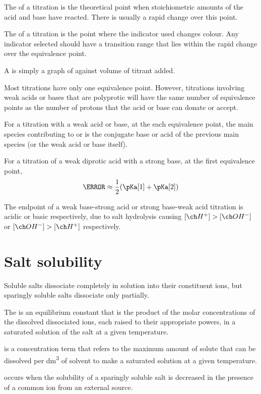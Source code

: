 \documentclass[Chemistry.tex]{subfiles}
\begin{document}
The  of a titration is the theoretical point when stoichiometric amounts of the acid and base have reacted. There is usually a rapid \pH{} change over this point.

The  of a titration is the point where the indicator used changes colour. Any indicator selected should have a \pH{} transition range that lies within the rapid change over the equivalence point.

A  is simply a graph of \pH{} against volume of titrant added.

Most titrations have only one equivalence point. However, titrations involving weak acids or bases that are polyprotic will have the same number of equivalence points as the number of protons that the acid or base can donate or accept.

For a titration with a weak acid or base, at the each equivalence point, the main species contributing to \pH{} or \pOH{} is the conjugate base or acid of the previous main species (or the weak acid or base itself).

For a titration of a weak diprotic acid with a strong base, at the first equivalence point, \begin{equation}\pH \approx \frac{1}{2}(\pKa[1] + \pKa[2])\end{equation}

The endpoint of a weak base-strong acid or strong base-weak acid titration is acidic or basic respectively, due to salt hydrolysis causing \(\conc{H^+} > \conc{OH^-}\) or \(\conc{OH^-} > \conc{H^+}\) respectively.
\section{Salt solubility}
Soluble salts dissociate completely in solution into their constituent ions, but sparingly soluble salts dissociate only partially.

The  is an equilibrium constant that is the product of the molar concentrations of the dissolved dissociated ions, each raised to their appropriate powers, in a saturated solution of the salt at a given temperature.

 is a concentration term that refers to the maximum amount of solute that can be dissolved per \si{\deci\metre\cubed} of solvent to make a saturated solution at a given temperature.

 occurs when the solubility of a sparingly soluble salt is decreased in the presence of a common ion from an external source.
\end{document}
